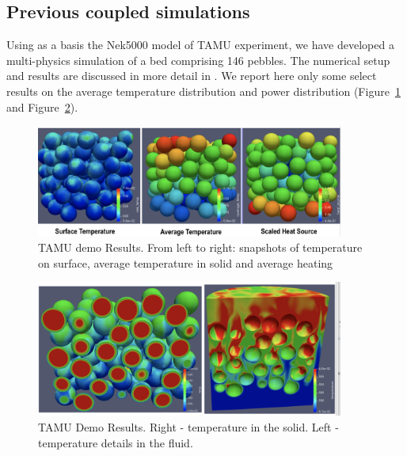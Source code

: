 \subsection{Previous coupled simulations}
\label{ss:c4}

Using as a basis the Nek5000 model of TAMU experiment, we have developed a multi-physics simulation of a bed comprising 146 pebbles. The numerical setup and results are discussed in more detail in \cite{cardinal}. We report here only some select results on the average temperature distribution and power distribution (Figure~\ref{f:dtamu1} and Figure~\ref{f:dtamu2}).

\begin{figure}[!h]
\centering
\includegraphics[clip=true,width=0.9\textwidth]{Figures/demo_r1}
\caption{TAMU demo Results. From left to right: snapshots of temperature on surface, average temperature in solid and average heating}
\label{f:dtamu1}
\end{figure}

\begin{figure}[!h]
\centering
\includegraphics[clip=true,width=0.9\textwidth]{Figures/demo_r2}
\caption{TAMU Demo Results. Right - temperature in the solid. Left - temperature details in the fluid.}
\label{f:dtamu2}
\end{figure}
